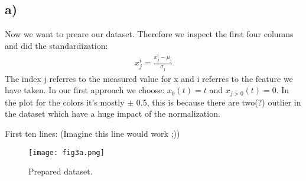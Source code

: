 \subsection{a)}
Now we want to preare our dataset. Therefore we inspect the first four columns and did the standardization:
\begin{align}
    x_j^{i} = \frac{x_j^{i} - \mu_j}{\sigma_j}
\end{align}
The index j referres to the measured value for x and i referres to the feature we have taken. In our first approach we choose: $x_0(t) = t$ and $x_{j>0}(t) = 0$. In the plot for the colors it's mostly $\pm$ 0.5, this is because there are two(?) outlier in the dataset which have a huge impact of the normalization.


First ten lines:
%
(Imagine this line would work ;))


\begin{figure}[h!]
    \centering
    \texttt{[image: fig3a.png]}
    \caption{Prepared dataset.}
\end{figure}




